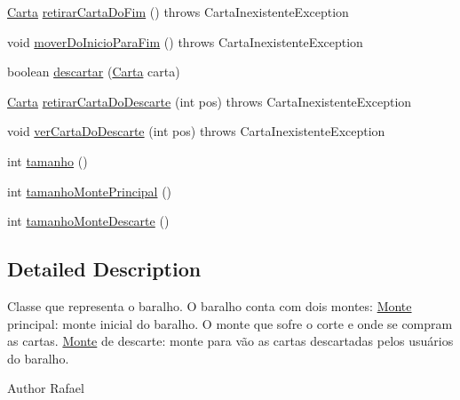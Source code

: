 \begin{DoxyCompactItemize}
\item 
\hyperlink{class_baralho_1_1_carta}{\-Carta} \hyperlink{class_baralho_1_1_baralho_a8441347c4eb47a0ba0f3bfbdfca59a9c}{retirar\-Carta\-Do\-Fim} ()  throws Carta\-Inexistente\-Exception 
\item 
void \hyperlink{class_baralho_1_1_baralho_a9df1c0a9c5c6c227b36e434248d5698d}{mover\-Do\-Inicio\-Para\-Fim} ()  throws Carta\-Inexistente\-Exception 
\item 
boolean \hyperlink{class_baralho_1_1_baralho_ad95b8caaaf2602be21923a9c02ab741f}{descartar} (\hyperlink{class_baralho_1_1_carta}{\-Carta} carta)
\item 
\hyperlink{class_baralho_1_1_carta}{\-Carta} \hyperlink{class_baralho_1_1_baralho_ad6ceed72b137e5bf5490af7dcd282648}{retirar\-Carta\-Do\-Descarte} (int pos)  throws Carta\-Inexistente\-Exception 
\item 
void \hyperlink{class_baralho_1_1_baralho_a9a20256555c03889f244ce40957ae7f8}{ver\-Carta\-Do\-Descarte} (int pos)  throws Carta\-Inexistente\-Exception 
\item 
int \hyperlink{class_baralho_1_1_baralho_ac382a9e91f65da63c8e3fac26eba6225}{tamanho} ()
\item 
int \hyperlink{class_baralho_1_1_baralho_aace43f8f3dbbca74e2e2b5083ec3f305}{tamanho\-Monte\-Principal} ()
\item 
int \hyperlink{class_baralho_1_1_baralho_a2c293b134d1b685b19e46376097c02b8}{tamanho\-Monte\-Descarte} ()
\end{DoxyCompactItemize}


\subsection{\-Detailed \-Description}
\-Classe que representa o baralho. \-O baralho conta com dois montes\-: \hyperlink{class_baralho_1_1_monte}{\-Monte} principal\-: monte inicial do baralho. \-O monte que sofre o corte e onde se compram as cartas. \hyperlink{class_baralho_1_1_monte}{\-Monte} de descarte\-: monte para vão as cartas descartadas pelos usuários do baralho. \begin{DoxyAuthor}{\-Author}
\-Rafael 
\end{DoxyAuthor}


